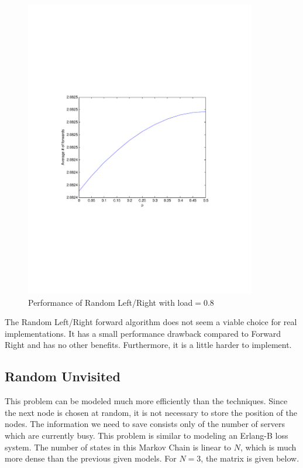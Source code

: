 \documentclass[10pt,a4paper]{article}
\begin{document}
\begin{figure}[h!tb]
\centering
\includegraphics[clip=true, trim=9em 24em 9em 24em, width=0.9\textwidth]{resources/plotrandlrp.pdf}
\caption{Performance of Random Left/Right with load$=0.8$}
\label{validrlrp}
\end{figure}

The Random Left/Right forward algorithm does not seem a viable choice for real implementations. It has a small performance drawback compared to Forward Right and has no other benefits. Furthermore, it is a little harder to implement.

\subsection*{Random Unvisited}
This problem can be modeled much more efficiently than the techniques. Since the next node is chosen at random, it is not necessary to store the position of the nodes. The information we need to save consists only of the number of servers which are currently busy. This problem is similar to modeling an Erlang-B loss system. The number of states in this Markov Chain is linear to $N$, which is much more dense than the previous given models. For $N=3$, the matrix is given below.
\end{document}
